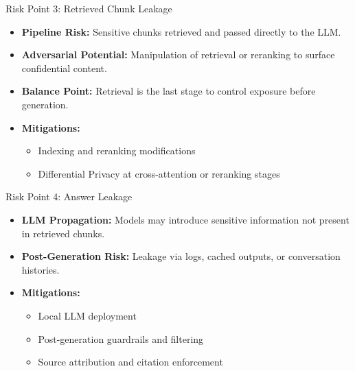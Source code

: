 \documentclass[aspectratio=169,xcolor=dvipsnames]{beamer}
\begin{document}
	\begin{frame}{Risk Point 3: Retrieved Chunk Leakage}
		
		\begin{itemize}
			\item \textbf{Pipeline Risk:} Sensitive chunks retrieved and passed directly to the LLM.
			
			\item \textbf{Adversarial Potential:} Manipulation of retrieval or reranking to surface confidential content.
			
			\item \textbf{Balance Point:} Retrieval is the last stage to control exposure before generation.
			
			\item \textbf{Mitigations:}
			\begin{itemize}
				\item Indexing and reranking modifications
				\item Differential Privacy at cross-attention or reranking stages
			\end{itemize}
		\end{itemize}
		
	\end{frame}
	
	\begin{frame}{Risk Point 4: Answer Leakage}
		
		\begin{itemize}
			\item \textbf{LLM Propagation:} Models may introduce sensitive information not present in retrieved chunks.
			
			\item \textbf{Post-Generation Risk:} Leakage via logs, cached outputs, or conversation histories.
			
			\item \textbf{Mitigations:}
			\begin{itemize}
				\item Local LLM deployment
				\item Post-generation guardrails and filtering
				\item Source attribution and citation enforcement
			\end{itemize}
		\end{itemize}
		
	\end{frame}
	
\end{document}
